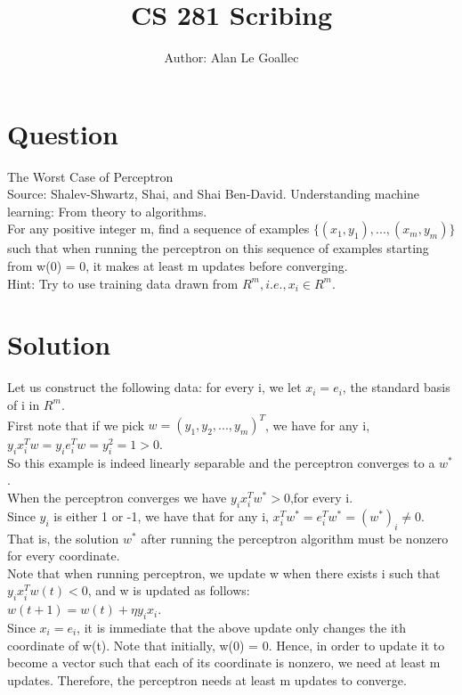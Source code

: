 \documentclass[11pt]{article}
\begin{document}
\title{CS 281 Scribing}
\maketitle
\author{Author: Alan Le Goallec}

\section{Question} The Worst Case of Perceptron\\
Source: Shalev-Shwartz, Shai, and Shai Ben-David. Understanding machine learning: From theory to algorithms.\\
For any positive integer m, find a sequence of examples $\{(x_1, y_1), ..., (x_m, y_m)\}$ such that when running the perceptron on this sequence of examples starting from w(0) = 0, it makes at least m updates before converging.\\

Hint: Try to use training data drawn from $R^m, i.e., x_i \in R^m$.


\section{Solution}
Let us construct the following data: for every i, we let $x_i = e_i$, the standard basis of i in $R^m$.\\
First note that if we pick $w = (y_1,y_2,...,y_m)^T$, we have for any i, $y_ix_i^Tw = y_ie_i^Tw =y_i^2 =1 >0$.\\
So this example is indeed linearly separable and the perceptron converges to a $w^*$.\\
When the perceptron converges we have $y_i x_i^Tw^* >0$,for every i. \\
Since $y_i$ is either 1 or -1, we have that for any i, $x_i^Tw^* =e_i^T w^* =(w^*)_i \neq 0$.\\
That is, the solution $w^*$ after running the perceptron algorithm must be nonzero for every coordinate.\\
Note that when running perceptron, we update w when there exists i such that $y_ix_i^T w(t) < 0$, and w is updated as follows:\\
$w(t+1) = w(t) + \eta y_ix_i$.\\
Since $x_i = e_i$, it is immediate that the above update only changes the ith coordinate of w(t). Note that initially, w(0) = 0. Hence, in order to update it to become a vector such that each of its coordinate is nonzero, we need at least m updates. Therefore, the perceptron needs at least m updates to converge.
\end{document}
